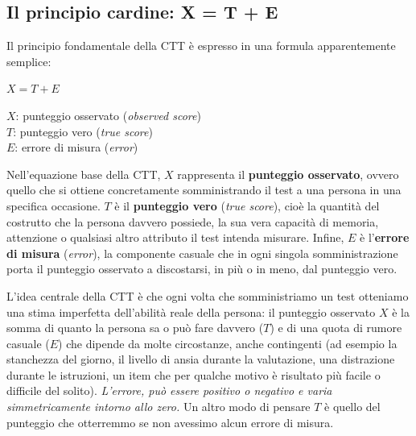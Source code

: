 \documentclass[
  italian,
  letterpaper,
  paper=6in:9in,
  pagesize=pdftex,
  headinclude=on,
  footinclude=on,
  11pt]{scrbook}
\begin{document}
\subsection{Il principio cardine: X = T +
E}\label{il-principio-cardine-x-t-e}

Il principio fondamentale della CTT è espresso in una formula
apparentemente semplice:

\begin{tcolorbox}[enhanced jigsaw, title=\textcolor{quarto-callout-note-color}{\faInfo}\hspace{0.5em}{Definizione}, coltitle=black, bottomtitle=1mm, colback=white, bottomrule=.15mm, rightrule=.15mm, breakable, toptitle=1mm, left=2mm, colbacktitle=quarto-callout-note-color!10!white, titlerule=0mm, colframe=quarto-callout-note-color-frame, leftrule=.75mm, opacitybacktitle=0.6, arc=.35mm, toprule=.15mm, opacityback=0]

\(X = T + E\)

\(X\): punteggio osservato (\emph{observed score})\\
\(T\): punteggio vero (\emph{true score})\\
\(E\): errore di misura (\emph{error})\\

\end{tcolorbox}

Nell'equazione base della CTT, \(X\) rappresenta il \textbf{punteggio
osservato}, ovvero quello che si ottiene concretamente somministrando il
test a una persona in una specifica occasione. \(T\) è il
\textbf{punteggio vero} (\emph{true score}), cioè la quantità del
costrutto che la persona davvero possiede, la sua vera capacità di
memoria, attenzione o qualsiasi altro attributo il test intenda
misurare. Infine, \(E\) è l'\textbf{errore di misura} (\emph{error}), la
componente casuale che in ogni singola somministrazione porta il
punteggio osservato a discostarsi, in più o in meno, dal punteggio vero.

L'idea centrale della CTT è che ogni volta che somministriamo un test
otteniamo una stima imperfetta dell'abilità reale della persona: il
punteggio osservato \(X\) è la somma di quanto la persona sa o può fare
davvero (\(T\)) e di una quota di rumore casuale (\(E\)) che dipende da
molte circostanze, anche contingenti (ad esempio la stanchezza del
giorno, il livello di ansia durante la valutazione, una distrazione
durante le istruzioni, un item che per qualche motivo è risultato più
facile o difficile del solito). \emph{L'errore, può essere positivo o
negativo e varia simmetricamente intorno allo zero.} Un altro modo di
pensare \(T\) è quello del punteggio che otterremmo se non avessimo
alcun errore di misura.
\end{document}
